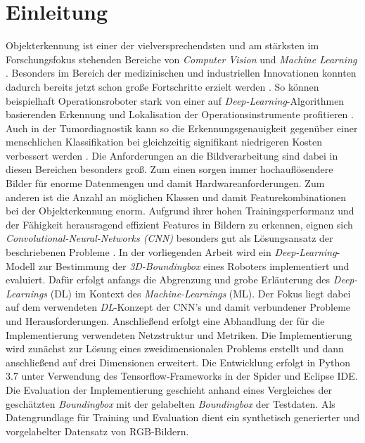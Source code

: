 \section{Einleitung}

Objekterkennung ist einer der vielversprechendsten und am stärksten im Forschungsfokus stehenden Bereiche von \textit{Computer Vision} und \textit{Machine Learning} \cite{Ouyang2014}. Besonders im Bereich der medizinischen und industriellen Innovationen konnten dadurch bereits jetzt schon große Fortschritte erzielt werden  \cite{Tremblay1809, Abstract2016}. So können beispielhaft Operationsroboter stark von einer auf \textit{Deep-Learning}-Algorithmen basierenden Erkennung und Lokalisation der Operationsinstrumente profitieren \cite{Surgery1803}. Auch in der Tumordiagnostik kann so die Erkennungsgenauigkeit gegenüber einer menschlichen Klassifikation bei gleichzeitig signifikant niedrigeren Kosten verbessert werden \cite{Cruz-Roa2017}.\newline
Die Anforderungen an die Bildverarbeitung sind dabei in diesen Bereichen besonders groß. Zum einen sorgen immer hochauflösendere Bilder für enorme Datenmengen und damit Hardwareanforderungen. Zum anderen ist die Anzahl an möglichen Klassen und damit Featurekombinationen bei der Objekterkennung enorm. Aufgrund ihrer hohen Trainingsperformanz und der Fähigkeit herausragend effizient Features in Bildern zu erkennen, eignen sich \textit{Convolutional-Neural-Networks (CNN)} besonders gut als Lösungsansatz der beschriebenen Probleme \cite{Ouyang2014}.\newline
In der vorliegenden Arbeit wird ein \textit{Deep-Learning}-Modell zur Bestimmung der \textit{3D-Boundingbox} eines Roboters implementiert und evaluiert.  Dafür erfolgt anfangs die Abgrenzung und grobe Erläuterung des \textit{Deep-Learnings} (DL) im Kontext des \textit{Machine-Learnings} (ML). Der Fokus liegt dabei auf dem verwendeten \textit{DL}-Konzept der CNN's und damit verbundener Probleme und Herausforderungen. Anschließend erfolgt eine Abhandlung der für die Implementierung verwendeten Netzstruktur und Metriken. Die Implementierung wird zunächst zur Lösung eines zweidimensionalen Problems erstellt und dann anschließend auf drei Dimensionen erweitert. Die Entwicklung erfolgt in Python 3.7 unter Verwendung des Tensorflow-Frameworks in der Spider und Eclipse IDE. Die Evaluation der Implementierung geschieht anhand eines Vergleiches der geschätzten \textit{Boundingbox} mit der gelabelten \textit{Boundingbox} der Testdaten. Als Datengrundlage für Training und Evaluation dient ein synthetisch generierter und vorgelabelter Datensatz von RGB-Bildern.   